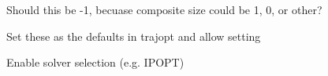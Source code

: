 \begin{DoxyRefList}
%
Should this be -\/1, becuase composite size could be 1, 0, or other?  
\item[Member \mbox{\hyperlink{classtesseract__planning_1_1TrajOptIfoptMotionPlanner_aa86732e70ee5102815d15b896927e14d}{tesseract\+\_\+planning\+::Traj\+Opt\+Ifopt\+Motion\+Planner\+::solve}} (const \mbox{\hyperlink{structtesseract__planning_1_1PlannerRequest}{Planner\+Request}} \&request, \mbox{\hyperlink{structtesseract__planning_1_1PlannerResponse}{Planner\+Response}} \&response, bool verbose=false) const override]\label{todo__todo000030}%
%
Set these as the defaults in trajopt and allow setting 

\label{todo__todo000029}%
%
Enable solver selection (e.\+g. IPOPT) 
\end{DoxyRefList}